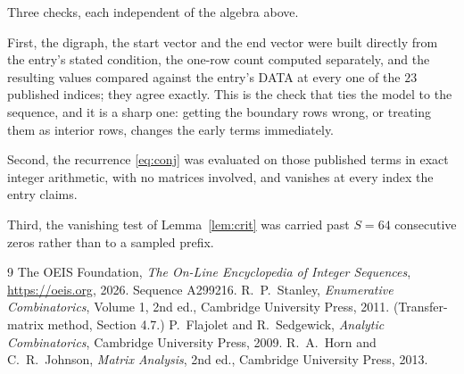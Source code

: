 \documentclass[11pt,a4paper]{article}
\theoremstyle{plain}
\theoremstyle{definition}
\begin{document}
Three checks, each independent of the algebra above.

First, the digraph, the start vector and the end vector were built directly from the
entry's stated condition, the one-row count computed separately, and the resulting values
compared against the entry's DATA at every one of the $23$ published indices; they
agree exactly. This is the check that ties the model to the sequence, and it is a sharp one:
getting the boundary rows wrong, or treating them as interior rows, changes the early terms
immediately.

Second, the recurrence \eqref{eq:conj} was evaluated on those published terms in exact
integer arithmetic, with no matrices involved, and vanishes at every index the entry claims.

Third, the vanishing test of Lemma~\ref{lem:crit} was carried past $S=64$ consecutive
zeros rather than to a sampled prefix.

\begin{thebibliography}{9}
 The OEIS Foundation, \emph{The On-Line Encyclopedia of Integer
Sequences}, \url{https://oeis.org}, 2026. Sequence A299216.
 R.~P.~Stanley, \emph{Enumerative Combinatorics}, Volume 1, 2nd ed.,
Cambridge University Press, 2011. (Transfer-matrix method, Section 4.7.)
 P.~Flajolet and R.~Sedgewick, \emph{Analytic Combinatorics}, Cambridge
University Press, 2009.
 R.~A.~Horn and C.~R.~Johnson, \emph{Matrix Analysis}, 2nd ed., Cambridge
University Press, 2013.
\end{thebibliography}
\end{document}
